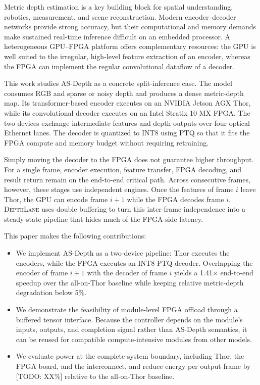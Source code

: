 \documentclass[sigconf]{support/acmart}
\newcommand{\system}{\textsc{DepthLane}}
\newcommand{\todo}[1]{\textcolor{ACMRed}{[TODO: #1]}}
\begin{document}
Metric depth estimation is a key building block for spatial understanding,
robotics, measurement, and scene reconstruction.  Modern encoder--decoder
networks provide strong accuracy, but their computational and memory demands
make sustained real-time inference difficult on an embedded processor.  A
heterogeneous GPU--FPGA platform offers complementary resources: the GPU is
well suited to the irregular, high-level feature extraction of an encoder,
whereas the FPGA can implement the regular convolutional dataflow of a decoder.

This work studies AS-Depth as a concrete split-inference case.  The model
consumes RGB and sparse or noisy depth and produces a dense metric-depth map.
Its transformer-based encoder executes on an NVIDIA Jetson AGX Thor, while its
convolutional decoder executes on an Intel Stratix 10 MX FPGA.  The two devices
exchange intermediate features and depth outputs over four optical Ethernet
lanes.  The decoder is quantized to INT8 using PTQ so that it fits the FPGA
compute and memory budget without requiring retraining.

Simply moving the decoder to the FPGA does not guarantee higher throughput.
For a single frame, encoder execution, feature transfer, FPGA decoding, and
result return remain on the end-to-end critical path.  Across consecutive
frames, however, these stages use independent engines.  Once the features of
frame $i$ leave Thor, the GPU can encode frame $i+1$ while the FPGA decodes
frame $i$.  \system{} uses double buffering to turn this inter-frame
independence into a steady-state pipeline that hides much of the FPGA-side
latency.

This paper makes the following contributions:
\begin{itemize}
  \item We implement AS-Depth as a two-device pipeline: Thor executes the
  encoders, while the FPGA executes an INT8 PTQ decoder.  Overlapping the
  encoder of frame $i+1$ with the decoder of frame $i$ yields a
  1.41$\times$ end-to-end speedup over the all-on-Thor baseline while keeping
  relative metric-depth degradation below 5\%.
  \item We demonstrate the feasibility of module-level FPGA offload through a
  buffered tensor interface.  Because the controller depends on the module's
  inputs, outputs, and completion signal rather than AS-Depth semantics, it can
  be reused for compatible compute-intensive modules from other models.
  \item We evaluate power at the complete-system boundary, including Thor, the
  FPGA board, and the interconnect, and reduce energy per output frame by
  \todo{XX\%} relative to the all-on-Thor baseline.
\end{itemize}
\end{document}
